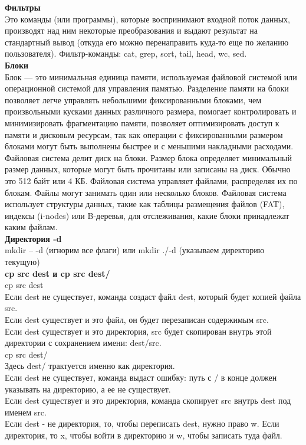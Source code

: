 \noindent \textbf{Фильтры} \\
\noindent Это команды (или программы), которые воспринимают входной поток данных, производят над ним некоторые преобразования и выдают результат на стандартный вывод (откуда его можно перенаправить куда-то еще по желанию пользователя). Фильтр-команды: cat, grep, sort, tail, head, wc, sed. \\

\noindent \textbf{Блоки} \\
Блок — это минимальная единица памяти, используемая файловой системой или операционной системой для управления памятью. Разделение памяти на блоки позволяет легче управлять небольшими фиксированными блоками, чем произвольными кусками данных различного размера, помогает контролировать и минимизировать фрагментацию памяти, позволяет оптимизировать доступ к памяти и дисковым ресурсам, так как операции с фиксированными размером блоками могут быть выполнены быстрее и с меньшими накладными расходами.  \\
Файловая система делит диск на блоки. Размер блока определяет минимальный размер данных, которые могут быть прочитаны или записаны на диск. Обычно это 512 байт или 4 КБ. Файловая система управляет файлами, распределяя их по блокам. Файлы могут занимать один или несколько блоков. Файловая система использует структуры данных, такие как таблицы размещения файлов (FAT), индексы (i-nodes) или B-деревья, для отслеживания, какие блоки принадлежат каким файлам. \\

\noindent \textbf{Директория -d} \\
mkdir -- -d (игнорим все флаги) или mkdir ./-d (указываем директорию текущую) \\

\noindent \textbf{cp src dest и cp src dest/} \\
cp src dest \\
Если dest не существует, команда создаст файл dest, который будет копией файла src. \\
Если dest существует и это файл, он будет перезаписан содержимым src. \\
Если dest существует и это директория, src будет скопирован внутрь этой директории с сохранением имени: dest/src. \\
cp src dest/ \\
Здесь dest/ трактуется именно как директория. \\
Если dest не существует, команда выдаст ошибку: путь с / в конце должен указывать на директорию, а ее не существует. \\
Если dest существует и это директория, команда скопирует src внутрь dest под именем src. \\
Если dest - не директория, то, чтобы переписать dest, нужно право w. Если директория, то x, чтобы войти в директорию и w, чтобы записать туда файл. \\

